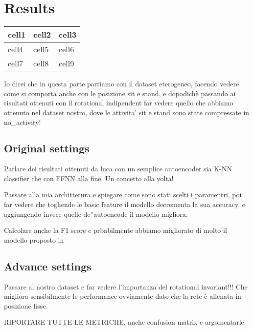 
\section{Results}
\label{sec:results}

\begin{center}
	\begin{tabular}{ p{2cm}p{2cm}p{2cm} } 
		\hline
		cell1 & cell2 & cell3 \\ 
		\hline
		cell4 & cell5 & cell6 \\ 
		cell7 & cell8 & cell9 \\ 
		\hline
	\end{tabular}
\end{center}

Io direi che in questa parte partiamo con il dataset eterogeneo, facendo vedere come si comporta anche con le posizione sit e stand, e dopodichè passando ai risultati ottenuti con il rotational indipendent far vedere quello che abbiamo ottenuto nel dataset nostro, dove le attivita' sit e stand sono state compressate in no\_activity!

\subsection{Original settings}

Parlare dei risultati ottenuti da luca con un semplice autoencoder sia K-NN classifier che con FFNN alla fine. Un concetto alla volta!

Passare alla mia archittetura e spiegare come sono stati scelti i paramentri, poi far vedere che togliende le basic feature il modello decrementa la sua accuracy, e aggiungendo invece quelle de''autoencode il modello migliora. 

Calcolare anche la F1 score e prbabilmente abbiamo migliorato di molto il modello proposto in \cite{blunck2013heterogeneity}

\subsection{Advance settings}
Passare al nostro dataset e far vedere l'importanza del rotational invariant!!! Che migliora sensibilmente le performance ovviamente dato che la rete è allenata in posizione fisse.

RIPORTARE TUTTE LE METRICHE, anche confusion matrix e argomentarle
